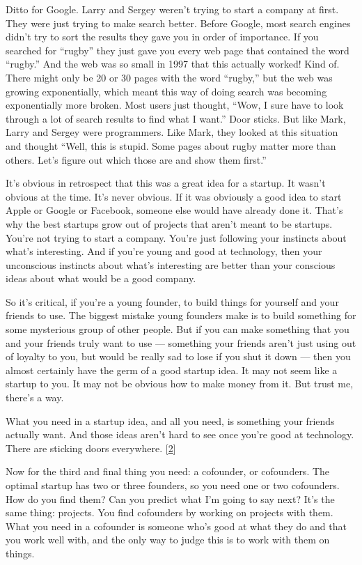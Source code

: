 Ditto for Google. Larry and Sergey weren't trying to start a company at
first. They were just trying to make search better. Before Google, most
search engines didn't try to sort the results they gave you in order of
importance. If you searched for ``rugby'' they just gave you every web
page that contained the word ``rugby.'' And the web was so small in 1997
that this actually worked! Kind of. There might only be 20 or 30 pages
with the word ``rugby,'' but the web was growing exponentially, which
meant this way of doing search was becoming exponentially more broken.
Most users just thought, ``Wow, I sure have to look through a lot of
search results to find what I want.'' Door sticks. But like Mark, Larry
and Sergey were programmers. Like Mark, they looked at this situation
and thought ``Well, this is stupid. Some pages about rugby matter more
than others. Let's figure out which those are and show them first.''

It's obvious in retrospect that this was a great idea for a startup. It
wasn't obvious at the time. It's never obvious. If it was obviously a
good idea to start Apple or Google or Facebook, someone else would have
already done it. That's why the best startups grow out of projects that
aren't meant to be startups. You're not trying to start a company.
You're just following your instincts about what's interesting. And if
you're young and good at technology, then your unconscious instincts
about what's interesting are better than your conscious ideas about what
would be a good company.

So it's critical, if you're a young founder, to build things for
yourself and your friends to use. The biggest mistake young founders
make is to build something for some mysterious group of other people.
But if you can make something that you and your friends truly want to
use --- something your friends aren't just using out of loyalty to you,
but would be really sad to lose if you shut it down --- then you almost
certainly have the germ of a good startup idea. It may not seem like a
startup to you. It may not be obvious how to make money from it. But
trust me, there's a way.

What you need in a startup idea, and all you need, is something your
friends actually want. And those ideas aren't hard to see once you're
good at technology. There are sticking doors everywhere.
{[}\hyperref[f2n]{2}{]}

Now for the third and final thing you need: a cofounder, or cofounders.
The optimal startup has two or three founders, so you need one or two
cofounders. How do you find them? Can you predict what I'm going to say
next? It's the same thing: projects. You find cofounders by working on
projects with them. What you need in a cofounder is someone who's good
at what they do and that you work well with, and the only way to judge
this is to work with them on things.

